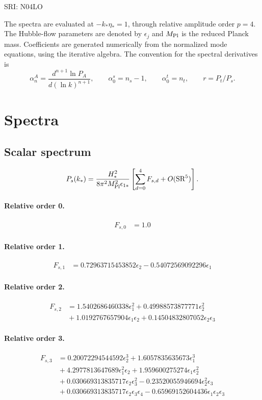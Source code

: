 \documentclass[10pt]{article}
\begin{document}
\begin{center}\Large SRI: N04LO\end{center}
The spectra are evaluated at $-k_*\eta_*=1$, through relative amplitude
order $p=4$. The Hubble-flow parameters are denoted by $\epsilon_j$
and $M_{\rm Pl}$ is the reduced Planck mass. Coefficients are generated
numerically from the normalized mode equations, using the iterative algebra.
The convention for the spectral derivatives is
\[
\alpha_n^A=\frac{d^{n+1}\ln P_A}{d(\ln k)^{n+1}},\qquad
\alpha_0^s=n_s-1,\qquad\alpha_0^t=n_t,\qquad r=P_t/P_s.
\]
\section{Spectra}

\subsection{Scalar spectrum}
\[P_s(k_*)=\frac{H_*^2}{8\pi^2M_{\rm Pl}^2\epsilon_{1*}}\left[\sum_{d=0}^{4}F_{s,d}+O(\mathrm{SR}^{5})\right].\]
\paragraph{Relative order 0.}
\begin{align*}
F_{s,0} &= 1.0
\end{align*}

\paragraph{Relative order 1.}
\begin{align*}
F_{s,1} &= 0.72963715453852 \epsilon_{2} - 0.54072569092296 \epsilon_{1}
\end{align*}

\paragraph{Relative order 2.}
\begin{align*}
F_{s,2} &= 1.5402686460338 \epsilon_{1}^{2} + 0.49988573877771 \epsilon_{2}^{2} \\
&{}  + 1.0192767657904 \epsilon_{1} \epsilon_{2} + 0.14504832807052 \epsilon_{2} \epsilon_{3}
\end{align*}

\paragraph{Relative order 3.}
\begin{align*}
F_{s,3} &= 0.20072294544592 \epsilon_{2}^{3} + 1.6057835635673 \epsilon_{1}^{3} \\
&{}  + 4.2977813647689 \epsilon_{1}^{2} \epsilon_{2} + 1.959600275274 \epsilon_{1} \epsilon_{2}^{2} \\
&{}  + 0.030669313835717 \epsilon_{2} \epsilon_{3}^{2} - 0.23520055946694 \epsilon_{2}^{2} \epsilon_{3} \\
&{}  + 0.030669313835717 \epsilon_{2} \epsilon_{3} \epsilon_{4} - 0.65969152604436 \epsilon_{1} \epsilon_{2} \epsilon_{3}
\end{align*}
\end{document}
